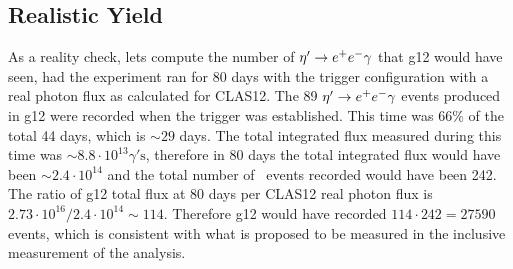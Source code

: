 \subsection{Realistic Yield}
As a reality check, lets compute the number of $\eta^{\prime} \to e^+e^- \gamma$ that g12 would have seen, had the experiment ran for 80 days with the \epemT trigger configuration with a real photon flux as calculated for CLAS12.
The 89 $\eta^{\prime} \to e^+e^- \gamma$ events produced in g12 were recorded when the \epemT trigger was established. This time was 66\% of the total 44 days, which is $\sim29$ days. The total integrated flux measured during this time was $\sim 8.8\cdot 10^{13} \gamma \mathrm{'s}$, therefore in 80 days the total integrated flux would have been $\sim 2.4\cdot 10^{14}$ and the total number of \etaPDal \ events recorded would have been 242. The ratio of g12 total flux at 80 days per CLAS12 real photon flux is $2.73\cdot 10^{16} / 2.4\cdot 10^{14} \sim 114 $. Therefore g12 would have recorded $114\cdot 242 = 27590$ \etaPDal events, which is consistent with what is proposed to be measured in the inclusive measurement of the analysis.